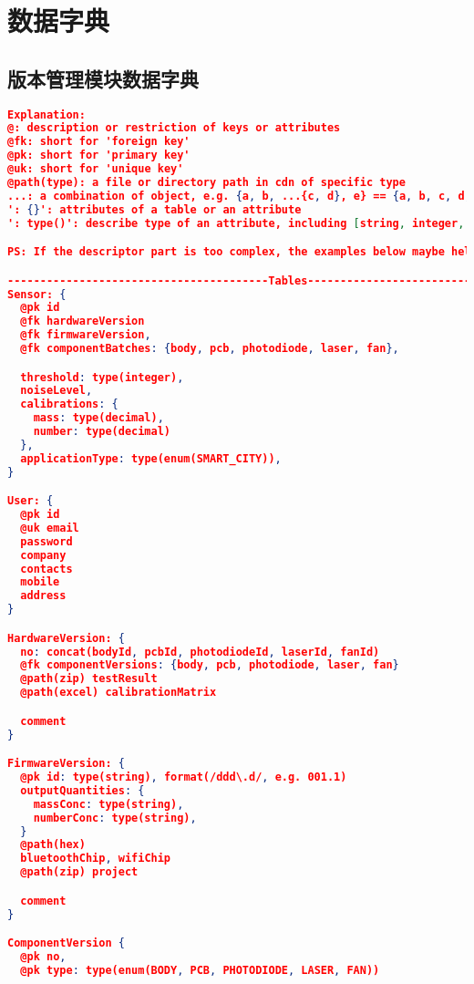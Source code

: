 
\chapter{数据字典}
\section{版本管理模块数据字典}

\begin{lstlisting}[language={JSON}, caption={版本管理模块的数据字典}]
Explanation:
@: description or restriction of keys or attributes
@fk: short for 'foreign key'
@pk: short for 'primary key'
@uk: short for 'unique key'
@path(type): a file or directory path in cdn of specific type
...: a combination of object, e.g. {a, b, ...{c, d}, e} == {a, b, c, d, e}
': {}': attributes of a table or an attribute
': type()': describe type of an attribute, including [string, integer, decimal, enum]

PS: If the descriptor part is too complex, the examples below maybe helpful.

----------------------------------------Tables-------------------------------------------
Sensor: {
  @pk id
  @fk hardwareVersion
  @fk firmwareVersion,
  @fk componentBatches: {body, pcb, photodiode, laser, fan},

  threshold: type(integer),
  noiseLevel,
  calibrations: {
    mass: type(decimal),
    number: type(decimal)
  },
  applicationType: type(enum(SMART_CITY)),
}

User: {
  @pk id
  @uk email
  password
  company
  contacts
  mobile
  address
}

HardwareVersion: {
  no: concat(bodyId, pcbId, photodiodeId, laserId, fanId)
  @fk componentVersions: {body, pcb, photodiode, laser, fan}
  @path(zip) testResult
  @path(excel) calibrationMatrix

  comment
}

FirmwareVersion: {
  @pk id: type(string), format(/ddd\.d/, e.g. 001.1)
  outputQuantities: {
    massConc: type(string),
    numberConc: type(string),
  }
  @path(hex)
  bluetoothChip, wifiChip
  @path(zip) project

  comment
}

ComponentVersion {
  @pk no,
  @pk type: type(enum(BODY, PCB, PHOTODIODE, LASER, FAN))


\end{lstlisting}

